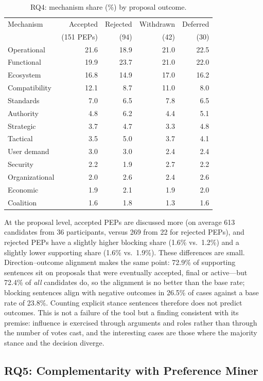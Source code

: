 \documentclass[sigconf,screen]{acmart}
\begin{document}
\begin{table}[t]
\caption{RQ4: mechanism share (\%) by proposal outcome.}
\label{tab:rq4}
\begin{tabular}{lrrrr}
\toprule
Mechanism & Accepted & Rejected & Withdrawn & Deferred \\
 & (151 PEPs) & (94) & (42) & (30) \\
\midrule
Operational & 21.6 & 18.9 & 21.0 & 22.5 \\
Functional & 19.9 & 23.7 & 21.0 & 22.0 \\
Ecosystem & 16.8 & 14.9 & 17.0 & 16.2 \\
Compatibility & 12.1 & 8.7 & 11.0 & 8.0 \\
Standards & 7.0 & 6.5 & 7.8 & 6.5 \\
Authority & 4.8 & 6.2 & 4.4 & 5.1 \\
Strategic & 3.7 & 4.7 & 3.3 & 4.8 \\
Tactical & 3.5 & 5.0 & 3.7 & 4.1 \\
User demand & 3.0 & 3.0 & 2.4 & 2.4 \\
Security & 2.2 & 1.9 & 2.7 & 2.2 \\
Organizational & 2.0 & 2.6 & 2.4 & 2.6 \\
Economic & 1.9 & 2.1 & 1.9 & 2.0 \\
Coalition & 1.6 & 1.8 & 1.3 & 1.6 \\
\bottomrule
\end{tabular}
\end{table}

At the proposal level, accepted PEPs are discussed more (on average 613 candidates from 36 participants, versus 269 from 22 for rejected PEPs), and rejected PEPs have a slightly higher blocking share (1.6\% vs.\ 1.2\%) and a slightly lower supporting share (1.6\% vs.\ 1.9\%). These differences are small. Direction--outcome alignment makes the same point: 72.9\% of supporting sentences sit on proposals that were eventually accepted, final or active---but 72.4\% of \emph{all} candidates do, so the alignment is no better than the base rate; blocking sentences align with negative outcomes in 26.5\% of cases against a base rate of 23.8\%. Counting explicit stance sentences therefore does not predict outcomes. This is not a failure of the tool but a finding consistent with its premise: influence is exercised through arguments and roles rather than through the number of votes cast, and the interesting cases are those where the majority stance and the decision diverge.

\subsection{RQ5: Complementarity with Preference Miner}
\end{document}
